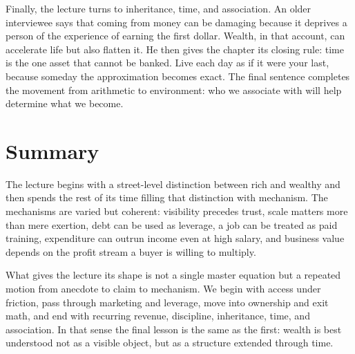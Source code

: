 Finally, the lecture turns to inheritance, time, and association. An older interviewee says that coming from money can be damaging because it deprives a person of the experience of earning the first dollar. Wealth, in that account, can accelerate life but also flatten it. He then gives the chapter its closing rule: time is the one asset that cannot be banked. Live each day as if it were your last, because someday the approximation becomes exact. The final sentence completes the movement from arithmetic to environment: who we associate with will help determine what we become.

\section{Summary}

The lecture begins with a street-level distinction between rich and wealthy and then spends the rest of its time filling that distinction with mechanism. The mechanisms are varied but coherent: visibility precedes trust, scale matters more than mere exertion, debt can be used as leverage, a job can be treated as paid training, expenditure can outrun income even at high salary, and business value depends on the profit stream a buyer is willing to multiply.

What gives the lecture its shape is not a single master equation but a repeated motion from anecdote to claim to mechanism. We begin with access under friction, pass through marketing and leverage, move into ownership and exit math, and end with recurring revenue, discipline, inheritance, time, and association. In that sense the final lesson is the same as the first: wealth is best understood not as a visible object, but as a structure extended through time.